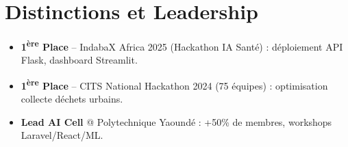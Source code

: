 \documentclass[a4paper,11pt]{article}
\begin{document}
\section{Distinctions et Leadership}
\begin{itemize}[leftmargin=*, label=\tiny$\bullet$, nosep]
    \item \small{\textbf{1\textsuperscript{ère} Place} -- IndabaX Africa 2025 (Hackathon IA Santé) : déploiement API Flask, dashboard Streamlit.}
    \item \small{\textbf{1\textsuperscript{ère} Place} -- CITS National Hackathon 2024 (75 équipes) : optimisation collecte déchets urbains.}
    \item \small{\textbf{Lead AI Cell} @ Polytechnique Yaoundé : +50\% de membres, workshops Laravel/React/ML.}
\end{itemize}
\end{document}
